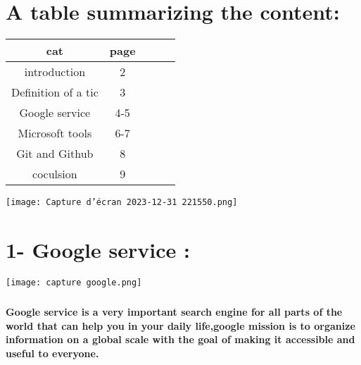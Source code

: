 \documentclass[a4paper,11pt]{report}
\begin{document}
\clearpage
\chapter{A table summarizing the content:}
\begin{tabular}{|c|c|c|c|c|}
    \hline
    \textbf{cat}&\textbf{page}\\
    \hline
    introduction& 2\\
    \hline
   Definition of a tic &3\\
    \hline
   Google service& 4-5 \\
    \hline
   Microsoft tools &6-7\\
    \hline
    Git and Github & 8\\
    \hline
    coculsion&9\\
    \hline
\end{tabular}



\texttt{[image: Capture d’écran 2023-12-31 221550.png]}



\clearpage

\chapter{1- Google service :}
\texttt{[image: capture google.png]}

\paragraph{}
\Large{\textbf{Google service is a very important search engine for all parts of the world  that can help you in your daily life,google mission is to organize information on a global scale with the goal of making it accessible and useful to everyone.}}
\paragraph{}
\large
\end{document}
